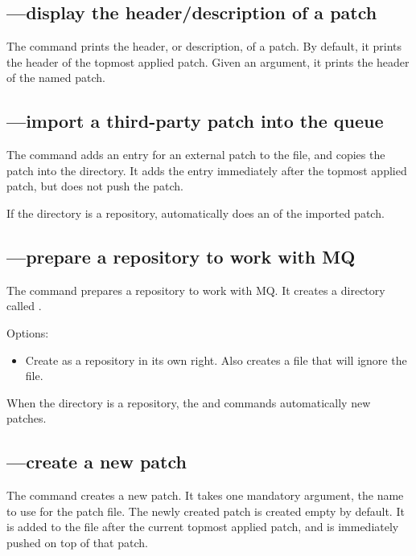 \subsection{---display the header/description of a patch}

The  command prints the header, or description, of a
patch.  By default, it prints the header of the topmost applied patch.
Given an argument, it prints the header of the named patch.

\subsection{---import a third-party patch into the queue}

The  command adds an entry for an external patch to the
 file, and copies the patch into the
 directory.  It adds the entry immediately after
the topmost applied patch, but does not push the patch.

If the  directory is a repository,
 automatically does an  of the imported
patch.

\subsection{---prepare a repository to work with MQ}

The  command prepares a repository to work with MQ.  It
creates a directory called .

Options:
\begin{itemize}
\item[\hgxopt{mq}{qinit}{-c}] Create  as a repository
  in its own right.  Also creates a  file that
  will ignore the  file.
\end{itemize}

When the  directory is a repository, the
 and  commands automatically 
new patches.

\subsection{---create a new patch}

The  command creates a new patch.  It takes one mandatory
argument, the name to use for the patch file.  The newly created patch
is created empty by default.  It is added to the 
file after the current topmost applied patch, and is immediately
pushed on top of that patch.

